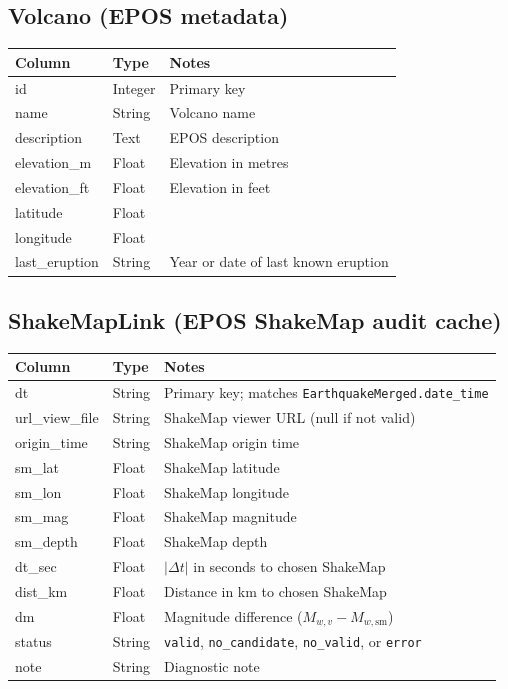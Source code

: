 \documentclass[12pt]{article}
\begin{document}
\subsection*{Volcano (EPOS metadata)}

\begin{table}[H]
\centering
\small
\begin{tabular}{l l l}
\hline
\textbf{Column} & \textbf{Type} & \textbf{Notes} \\
\hline
id            & Integer & Primary key \\
name          & String  & Volcano name \\
description   & Text    & EPOS description \\
elevation\_m  & Float   & Elevation in metres \\
elevation\_ft & Float   & Elevation in feet \\
latitude      & Float   & \\
longitude     & Float   & \\
last\_eruption & String & Year or date of last known eruption \\
\hline
\end{tabular}
\end{table}

\subsection*{ShakeMapLink (EPOS ShakeMap audit cache)}

\begin{table}[H]
\centering
\small
\begin{tabular}{l l l}
\hline
\textbf{Column} & \textbf{Type} & \textbf{Notes} \\
\hline
dt              & String  & Primary key; matches \texttt{EarthquakeMerged.date\_time} \\
url\_view\_file & String  & ShakeMap viewer URL (null if not valid) \\
origin\_time    & String  & ShakeMap origin time \\
sm\_lat         & Float   & ShakeMap latitude \\
sm\_lon         & Float   & ShakeMap longitude \\
sm\_mag         & Float   & ShakeMap magnitude \\
sm\_depth       & Float   & ShakeMap depth \\
dt\_sec         & Float   & $|\Delta t|$ in seconds to chosen ShakeMap \\
dist\_km        & Float   & Distance in km to chosen ShakeMap \\
dm              & Float   & Magnitude difference ($M_{w,v} - M_{w,\text{sm}}$) \\
status          & String  & \texttt{valid}, \texttt{no\_candidate}, \texttt{no\_valid}, or \texttt{error} \\
note            & String  & Diagnostic note \\
\hline
\end{tabular}
\end{table}

\clearpage
{}
{}


\end{document}
